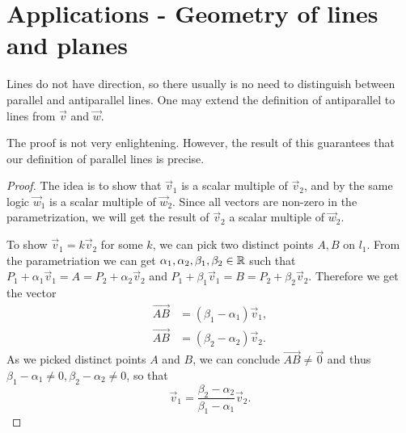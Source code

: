 \section{Applications - Geometry of lines and planes}
\begin{remark}
	Lines do not have direction, so there usually is no need to distinguish between parallel and antiparallel lines. One may extend the definition of antiparallel to lines from $\vec{v}$ and $\vec{w}$.
\end{remark}
The proof is not very enlightening. However, the result of this guarantees that our definition of parallel lines is precise.
\begin{proof}
	The idea is to show that $\vec{v}_1$ is a scalar multiple of $\vec{v}_2$, and by the same logic $\vec{w}_1$ is a scalar multiple of $\vec{w}_2$. Since all vectors are non-zero in the parametrization, we will get the result of $\vec{v}_2$ a scalar multiple of $\vec{w}_2$. 
	
	To show $\vec{v}_1=k\vec{v}_2$ for some $k$, we can pick two distinct points $A,B$ on $l_1$. From the parametriation we can get $\alpha_1,\alpha_2,\beta_1,\beta_2\in\mathbb{R}$ such that $P_1+\alpha_1\vec{v}_1=A=P_2+\alpha_2\vec{v}_2$ and $P_1+\beta_1\vec{v}_1=B=P_2+\beta_2\vec{v}_2$. Therefore we get the vector \begin{align*}
		\overrightarrow{AB}&=(\beta_1-\alpha_1)\vec{v}_1,\\
		\overrightarrow{AB}&=(\beta_2-\alpha_2)\vec{v}_2.
	\end{align*}
	As we picked distinct points $A$ and $B$, we can conclude $\overrightarrow{AB}\neq\vec{0}$ and thus $\beta_1-\alpha_1\neq0,\beta_2-\alpha_2\neq0$, so that \[
		\vec{v}_1= \frac{\beta_2-\alpha_2}{\beta_1-\alpha_1}\vec{v}_2.
	\]
\end{proof}

